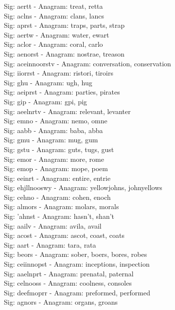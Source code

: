 Sig: {aertt} - Anagram: treat, retta \\
Sig: {aclns} - Anagram: clans, lancs \\
Sig: {aprst} - Anagram: traps, parts, strap \\
Sig: {aertw} - Anagram: water, ewart \\
Sig: {aclor} - Anagram: coral, carlo \\
Sig: {aenorst} - Anagram: nostrae, treason \\
Sig: {aceinnoorstv} - Anagram: conversation, conservation \\
Sig: {iiorrst} - Anagram: ristori, tiroirs \\
Sig: {ghu} - Anagram: ugh, hug \\
Sig: {aeiprst} - Anagram: parties, pirates \\
Sig: {gip} - Anagram: gpi, pig \\
Sig: {aeelnrtv} - Anagram: relevant, levanter \\
Sig: {emno} - Anagram: nemo, omne \\
Sig: {aabb} - Anagram: baba, abba \\
Sig: {gmu} - Anagram: mug, gum \\
Sig: {gstu} - Anagram: guts, tugs, gust \\
Sig: {emor} - Anagram: more, rome \\
Sig: {emop} - Anagram: mope, poem \\
Sig: {eeinrt} - Anagram: entire, entrie \\
Sig: {ehjllnooswy} - Anagram: yellowjohns, johnyellows \\
Sig: {cehno} - Anagram: cohen, enoch \\
Sig: {almors} - Anagram: molars, morals \\
Sig: {'ahnst} - Anagram: hasn't, shan't \\
Sig: {aailv} - Anagram: avila, avail \\
Sig: {acost} - Anagram: ascot, coast, coats \\
Sig: {aart} - Anagram: tara, rata \\
Sig: {beors} - Anagram: sober, boers, bores, robes \\
Sig: {ceiinnopst} - Anagram: inceptions, inspection \\
Sig: {aaelnprt} - Anagram: prenatal, paternal \\
Sig: {celnooss} - Anagram: coolness, consoles \\
Sig: {deefmoprr} - Anagram: preformed, performed \\
Sig: {agnors} - Anagram: organs, groans \\
